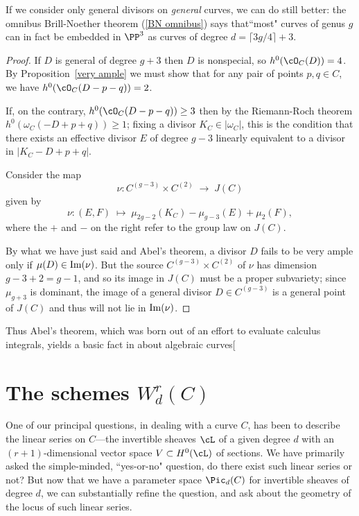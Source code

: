 If we consider only general divisors on \emph{general} curves, we can do still better: the omnibus Brill-Noether theorem (\ref{BN omnibus}) says that``most" curves of genus $g$ can in fact be embedded in $\PP^{3}$ as curves of degree $d = \lceil 3g/4 \rceil + 3$.

\begin{proof}
If $D$ is general of degree $g+3$ then $D$ is nonspecial, so $h^0(\cO_C(D)) = 4$. By Proposition~\ref{very ample} we must show that
for any pair of points $p, q \in C$, we have $h^0(\cO_C(D-p-q)) = 2$.

If, on the contrary, $h^0(\cO_C(D-p-q)) \geq 3$ then by the Riemann-Roch theorem $h^0(\omega_C(-D + p + q)) \geq 1$; fixing a divisor 
$K_{C}\in |\omega_{C}|$, this is the condition that there exists  
an effective divisor $E$ of degree $g-3$ linearly equivalent to a divisor in $|K_C - D + p + q|$. 

Consider the map 
$$
\nu : C^{(g-3)} \times C^{(2)} \; \to \; J(C)
$$
given by
$$
\nu : (E,F) \; \mapsto \; \mu_{2g-2}(K_C) - \mu_{g-3}(E) + \mu_{2}(F), 
$$
where the $+$ and $-$ on the right refer to the group law on $J(C)$. 

By what we have just said and Abel's theorem, a divisor $D$ fails to be very ample only if
$\mu(D) \in {\rm Im}(\nu)$. But the source $C^{(g-3)} \times C^{(2)}$ of $\nu$ has dimension $g-3+2 = g-1$, and so its image in $J(C)$ must be a proper subvariety; since $\mu_{g+3}$ is dominant, the image of a general divisor $D \in C^{(g-3)}$ is a general point of $J(C)$ and thus will not lie in ${\rm Im}(\nu)$. 
\end{proof}

Thus Abel's theorem, which was born out of an effort to evaluate calculus integrals, yields a basic fact in about algebraic curves[


\section{The schemes $W^r_d(C)$}

One of our principal questions, in dealing with a curve $C$, has been to describe the linear series on $C$---the invertible sheaves $\cL$ of a given degree $d$ with an $(r+1)$-dimensional  vector space $V \subset H^0(\cL)$ of sections. We have primarily asked the simple-minded, ``yes-or-no" question, do there exist such linear series or not? But now that we have a parameter space $\Pic_d(C)$ for invertible sheaves of degree $d$, we can substantially refine the question, and ask about the geometry of the locus of such linear series.

